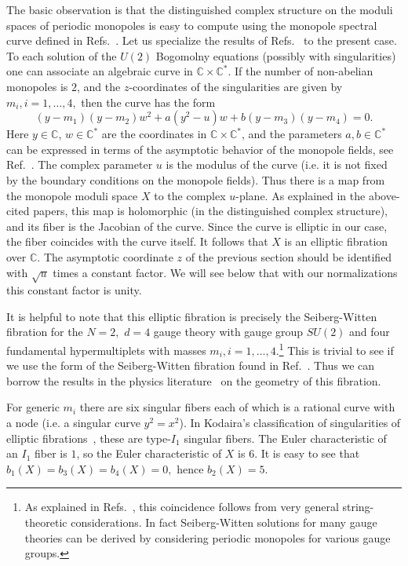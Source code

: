 \documentclass[a4paper,12pt, amsfonts, amssymb]{article}
\newcommand{\CC}{{\mathbb C}}
\begin{document}
The basic observation is that the distinguished complex structure
on the moduli spaces of periodic monopoles is easy to compute using the
monopole spectral curve defined in Refs.~\cite{usone,ustwo}.
Let us specialize the
results of Refs.~\cite{usone,ustwo} to the present case. To each
solution of the $U(2)$ Bogomolny equations (possibly with singularities)
one can associate an algebraic curve in $\CC\times \CC^*$. If the number
of non-abelian monopoles is $2$, and the $z$-coordinates of the singularities
are given by $m_i,i=1,\ldots,4,$ then the curve has the form
$$
(y-m_1)(y-m_2)w^2+a(y^2-u)w+b(y-m_3)(y-m_4)=0.
$$
Here $y\in\CC$, $w\in\CC^*$ are the coordinates in $\CC\times\CC^*$, and the parameters $a,b\in\CC^*$ can be expressed in terms of the asymptotic behavior of the monopole fields, see Ref.~\cite{ustwo}.
The complex parameter $u$ is the modulus of the curve (i.e. it is not fixed
by the boundary conditions on the monopole fields).
Thus there is a map from the monopole moduli space $X$ to the complex
$u$-plane. As explained in the above-cited papers, this map is holomorphic (in the distinguished complex structure), and its
fiber is the Jacobian of the curve. Since the curve is elliptic in our case,
the fiber coincides with the curve itself. It follows that $X$ is an
elliptic fibration over $\CC$. The asymptotic
coordinate $z$ of the previous section should be identified with $\sqrt u$
times a constant factor. We will see below that with our normalizations
this constant factor is unity.

It is helpful to note that this elliptic fibration is precisely
the Seiberg-Witten fibration for the $N=2,$ $d=4$ gauge theory with gauge group $SU(2)$ and four fundamental hypermultiplets with masses
$m_i,i=1,\ldots,4.$\footnote{As explained in Refs.~\cite{usone,ustwo}, this coincidence follows from very general string-theoretic considerations. In fact
Seiberg-Witten solutions for many gauge theories can be derived by considering
periodic monopoles for various gauge groups.}
This is trivial to see if we use the form of the Seiberg-Witten fibration
found in Ref.~\cite{Witten}. Thus we can borrow the results
in the physics literature~\cite{SW1,SW2,APSW} on the geometry of this fibration.

For generic $m_i$ there are six singular fibers each of which is a rational curve with a node (i.e. a singular curve $y^2=x^2$). In Kodaira's classification of singularities of elliptic fibrations~\cite{Ko},
these are type-$I_1$ singular fibers. The Euler characteristic of an
$I_1$ fiber is $1$, so the Euler characteristic of $X$ is $6$. It is easy to see that $b_1(X)=b_3(X)=b_4(X)=0,$ hence $b_2(X)=5$.
\end{document}

